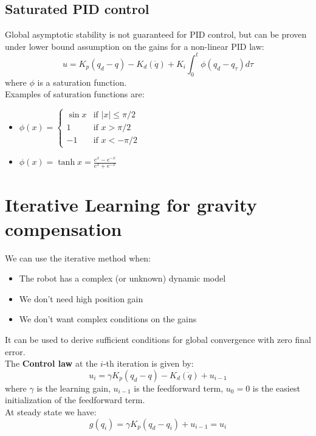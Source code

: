 \documentclass[a4paper,12pt]{article}
\begin{document}
\subsection{Saturated PID control}
Global asymptotic stability is not guaranteed for PID control, but can be
proven under lower bound assumption on the gains for a 
non-linear PID law:
\begin{equation}
    u = K_p(q_d-q) - K_d(\dot{q}) + K_i \int_0^t \phi(q_d-q_\tau)d\tau
\end{equation}
where $\phi$ is a saturation function.\\
Examples of saturation functions are:
\begin{itemize}
    \item $\phi(x) = \begin{cases}
        \sin x & \text{if } |x| \leq \pi/2\\
        1 & \text{if } x > \pi/2\\
        -1 & \text{if } x < -\pi/2
    \end{cases}$
    \item $\phi(x) =\tanh x = \frac{e^x-e^{-x}}{e^x+e^{-x}}$
\end{itemize}





\section{Iterative Learning for gravity compensation}
We can use the iterative method when:
\begin{itemize}
    \item The robot has a complex (or unknown) dynamic model
    \item We don't need high position gain 
    \item We don't want complex conditions on the gains
\end{itemize}
It can be used to derive sufficient conditions for global
convergence with zero final error.\\
The \textbf{Control law} at the $i$-th iteration is given by:
\begin{equation}
    u_i = \gamma K_p(q_d-q) - K_d(\dot{q}) + u_{i-1}
\end{equation}
where $\gamma$ is the learning gain, $u_{i-1}$ is 
the feedforward term, $u_0=0$ is the easiest 
initialization of the feedforward term.\\
At steady state we have:
\begin{equation}
    g(q_i)=\gamma K_p(q_d-q_i) + u_{i-1} = u_i
\end{equation}
\end{document}

